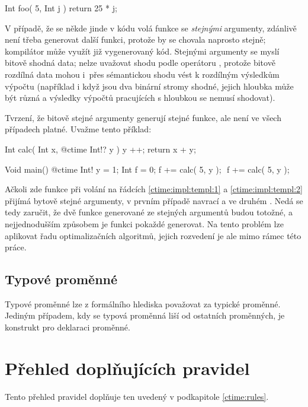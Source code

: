\begin{code}
Int foo( 5, Int j ) {
	return 25 * j;
}
\end{code}

V případě, že se někde jinde v kódu volá funkce  se \textit{stejnými} \ctime argumenty, zdánlivě není třeba generovat další funkci, protože by se chovala naprosto stejně; kompilátor může využít již vygenerovaný kód. Stejnými \ctime argumenty se myslí bitově shodná data; nelze uvažovat shodu podle operátoru \inlineCode{==}, protože bitově rozdílná data mohou i~přes sémantickou shodu vést k rozdílným výsledkům výpočtu (například i když jsou dva binární stromy shodné, jejich hloubka může být různá a výsledky výpočtů pracujících s hloubkou se nemusí shodovat).

Tvrzení, že bitově stejné \ctime argumenty generují stejné funkce, ale není ve všech případech platné. Uvažme tento příklad:
\begin{code}
Int calc( Int x, @ctime Int!? y ) {
	y ++;
	return x + y;
}

Void main() {
	@ctime Int! y = 1;
	Int f = 0;
	f += calc( 5, y ); $\label{ctime:impl:templ:1}$
	f += calc( 5, y ); $\label{ctime:impl:templ:2}$
}
\end{code}

Ačkoli zde funkce  při volání na řádcích \ref{ctime:impl:templ:1} a \ref{ctime:impl:templ:2} přijímá bytově stejné \ctime argumenty, v prvním případě navrací  a ve druhém . Nedá se tedy zaručit, že dvě funkce generované ze stejných \ctime argumentů budou totožné, a nejjednodušším způsobem je funkci pokaždé generovat. Na tento problém lze aplikovat řadu optimalizačních algoritmů, jejich rozvedení je ale mimo rámec této práce.

\subsection{Typové proměnné}
Typové proměnné lze z formálního hlediska považovat za typické \ctime proměnné. Jediným případem, kdy se typová proměnná liší od ostatních \ctime proměnných, je konstrukt pro deklaraci proměnné.


\section{Přehled doplňujících pravidel} \label{ctime:moreRules}
Tento přehled pravidel doplňuje ten uvedený v podkapitole \ref{ctime:rules}.


